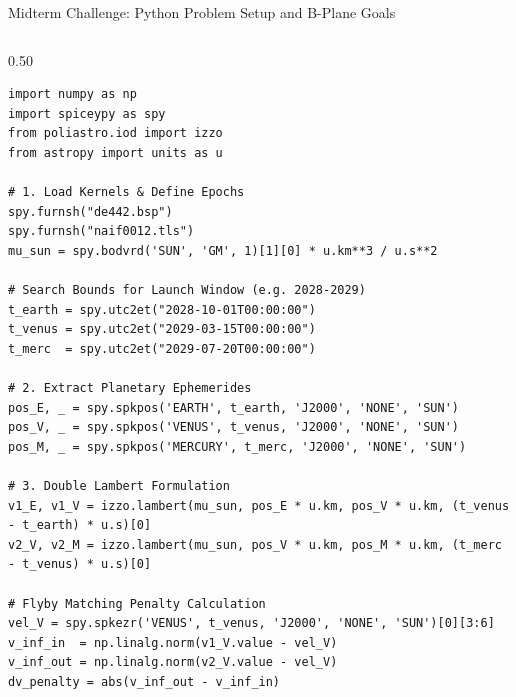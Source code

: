 \documentclass[aspectratio=169, 10pt]{beamer}
\begin{document}
\begin{frame}[fragile]{Midterm Challenge: Python Problem Setup and B-Plane Goals}
\begin{columns}[t]
        \begin{column}{0.50\textwidth}
\begin{lstlisting}[style=pythoncode]
import numpy as np
import spiceypy as spy
from poliastro.iod import izzo
from astropy import units as u

# 1. Load Kernels & Define Epochs
spy.furnsh("de442.bsp")
spy.furnsh("naif0012.tls")
mu_sun = spy.bodvrd('SUN', 'GM', 1)[1][0] * u.km**3 / u.s**2

# Search Bounds for Launch Window (e.g. 2028-2029)
t_earth = spy.utc2et("2028-10-01T00:00:00")
t_venus = spy.utc2et("2029-03-15T00:00:00")
t_merc  = spy.utc2et("2029-07-20T00:00:00")

# 2. Extract Planetary Ephemerides
pos_E, _ = spy.spkpos('EARTH', t_earth, 'J2000', 'NONE', 'SUN')
pos_V, _ = spy.spkpos('VENUS', t_venus, 'J2000', 'NONE', 'SUN')
pos_M, _ = spy.spkpos('MERCURY', t_merc, 'J2000', 'NONE', 'SUN')

# 3. Double Lambert Formulation
v1_E, v1_V = izzo.lambert(mu_sun, pos_E * u.km, pos_V * u.km, (t_venus - t_earth) * u.s)[0]
v2_V, v2_M = izzo.lambert(mu_sun, pos_V * u.km, pos_M * u.km, (t_merc - t_venus) * u.s)[0]

# Flyby Matching Penalty Calculation
vel_V = spy.spkezr('VENUS', t_venus, 'J2000', 'NONE', 'SUN')[0][3:6]
v_inf_in  = np.linalg.norm(v1_V.value - vel_V)
v_inf_out = np.linalg.norm(v2_V.value - vel_V)
dv_penalty = abs(v_inf_out - v_inf_in)
\end{lstlisting}
        \end{column}
    \end{columns}
\end{frame}
\end{document}
